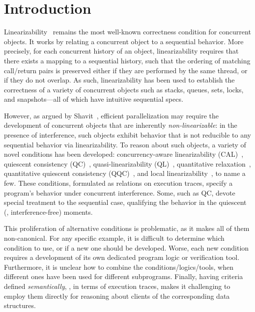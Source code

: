 

\section{Introduction}
\label{sec:introduction}

Linearizability~\cite{Herlihy-Wing:TOPLAS90} remains the
most well-known correctness condition for concurrent objects.
% 
It works by relating a concurrent object to a sequential behavior.
More precisely, for each concurrent history of an object,
linearizability requires that there exists a mapping to a sequential
history, such that the ordering of matching call/return pairs is
preserved either if they are performed by the same thread, or if they
do not overlap.
%
As such, linearizability has been used to establish the correctness of
a variety of concurrent objects such as stacks, queues, sets, locks,
and snapshots---all of which have intuitive sequential specs.
%

However, as argued by Shavit~\cite{Shavit:CACM11}, efficient
parallelization may require the development of concurrent objects
that are inherently \emph{non-linearizable}: in the presence of
interference, such objects exhibit behavior that is not reducible to
any sequential behavior via linearizability. To reason about such
objects, a variety of novel conditions has been developed:
concurrency-aware linearizability (CAL)~\cite{Hemed-Rinetzky:PODC14},
quiescent consistency (QC)~\cite{Aspnes-al:JACM94,Derrick-al:FM14},
quasi-linearizability (QL)~\cite{Afek-al:OPODIS10}, quantitative
relaxation~\cite{Henzinger-al:POPL13}, quantitative quiescent
consistency (QQC)~\cite{Jagadeesan-Riely:ICALP14}, and local
linearizability~\cite{Haas-al-local15}, to name a few.
%
These conditions, formulated as relations on execution traces, specify
a program's behavior under concurrent interference. Some, such as QC,
devote special treatment to the sequential case, qualifying the
behavior in the quiescent (\ie, interference-free) moments.
%

This proliferation of alternative conditions is problematic, as it
makes all of them non-canonical. For any specific example, it is
difficult to determine which condition to use, or if a new one should
be developed. Worse, each new condition requires a development of its
own dedicated program logic or verification tool. Furthermore, it is
unclear how to combine the conditions/logics/tools, when different
ones have been used for different subprograms.
%
Finally, having criteria defined \emph{semantically}, \eg, in terms of
execution traces, makes it challenging to employ them directly for
reasoning about clients of the corresponding data structures.

